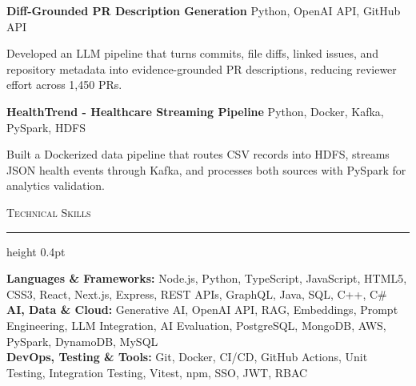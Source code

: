\documentclass[letterpaper,11pt]{article}
\newcommand{\resumesection}[1]{%
  \par\vspace{2pt}%
  {\large\scshape #1}\par\vspace{2pt}%
  \hrule height 0.4pt\vspace{2pt}%
}
\newcommand{\projectHeading}[2]{
  \textbf{#1} \hfill #2
}
\begin{document}
\projectHeading{Diff-Grounded PR Description Generation}{Python, OpenAI API, GitHub API}
\begin{tightitemize}
  \item Developed an LLM pipeline that turns commits, file diffs, linked issues, and repository metadata into evidence-grounded PR descriptions, reducing reviewer effort across 1,450 PRs.
\end{tightitemize}

\projectHeading{HealthTrend - Healthcare Streaming Pipeline}{Python, Docker, Kafka, PySpark, HDFS}
\begin{tightitemize}
  \item Built a Dockerized data pipeline that routes CSV records into HDFS, streams JSON health events through Kafka, and processes both sources with PySpark for analytics validation.
\end{tightitemize}

\resumesection{Technical Skills}
\textbf{Languages \& Frameworks:} Node.js, Python, TypeScript, JavaScript, HTML5, CSS3, React, Next.js, Express, REST APIs, GraphQL, Java, SQL, C++, C\#\\
\textbf{AI, Data \& Cloud:} Generative AI, OpenAI API, RAG, Embeddings, Prompt Engineering, LLM Integration, AI Evaluation, PostgreSQL, MongoDB, AWS, PySpark, DynamoDB, MySQL\\
\textbf{DevOps, Testing \& Tools:} Git, Docker, CI/CD, GitHub Actions, Unit Testing, Integration Testing, Vitest, npm, SSO, JWT, RBAC
\end{document}
